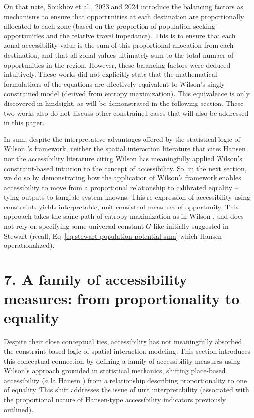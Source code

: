 \documentclass[
  10pt,
  letterpaper,
]{article}
\begin{document}
On that note, Soukhov et al., 2023 and 2024
\citep{soukhovIntroducingSpatialAvailability2023, soukhovMultimodalSpatialAvailability2024}
introduce the balancing factors as mechanisms to ensure that
opportunities at each destination are proportionally allocated to each
zone (based on the proportion of population seeking opportunities and
the relative travel impedance). This is to ensure that each zonal
accessibility value is the sum of this proportional allocation from each
destination, and that all zonal values ultimately sum to the total
number of opportunities in the region. However, these balancing factors
were deduced intuitively. These works did not explicitly state that the
mathematical formulations of the equations are effectively equivalent to
Wilson's singly-constrained model (derived from entropy maximization).
This equivalence is only discovered in hindsight, as will be
demonstrated in the following section. These two works also do not
discuss other constrained cases that will also be addressed in this
paper.

In sum, despite the interpretative advantages offered by the statistical
logic of Wilson \citep{wilson1971}'s framework, neither the spatial
interaction literature that cites Hansen \citep{hansen1959} nor the
accessibility literature citing Wilson \citep{wilson1971} has
meaningfully applied Wilson's constraint-based intuition to the concept
of accessibility. So, in the next section, we do so by demonstrating how
the application of Wilson's framework enables accessibility to move from
a proportional relationship to calibrated equality -- tying outputs to
tangible system knowns. This re-expression of accessibility using
constraints yields interpretable, unit-consistent measures of
opportunity. This approach takes the same path of entropy-maximization
as in Wilson \citep{wilson1971}, and does not rely on specifying some
universal constant \(G\) like initially suggested in Stewart
\citep{stewartDemographicGravitationEvidence1948} (recall,
Eq~\ref{eq-stewart-population-potential-sum} which Hansen
\citep{hansen1959} operationalized).

\section{7. A family of accessibility measures: from proportionality to
equality}\label{a-family-of-accessibility-measures-from-proportionality-to-equality}

Despite their close conceptual ties, accessibility has not meaningfully
absorbed the constraint-based logic of spatial interaction modeling.
This section introduces this conceptual connection by defining a family
of accessibility measures using Wilson's approach grounded in
statistical mechanics, shifting place-based accessibility (\(\grave{a}\)
la Hansen \citep{hansen1959}) from a relationship describing
proportionality to one of equality. This shift addresses the issue of
unit interpretability (associated with the proportional nature of
Hansen-type accessibility indicators previously outlined).
\end{document}
